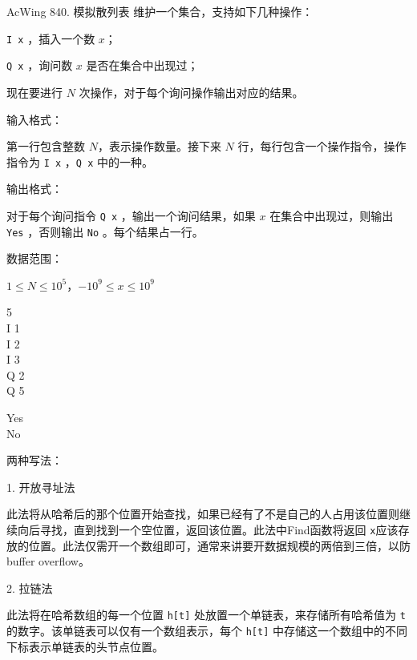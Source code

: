 \begin{titledbox}{AcWing 840. 模拟散列表}
维护一个集合，支持如下几种操作：

\lstinline{I x} ，插入一个数 $x$；

\lstinline{Q x} ，询问数 $x$ 是否在集合中出现过；

现在要进行 $N$ 次操作，对于每个询问操作输出对应的结果。

输入格式：

第一行包含整数 $N$，表示操作数量。接下来 $N$ 行，每行包含一个操作指令，操作指令为 \lstinline{I x} ，\lstinline{Q x}  中的一种。

输出格式：

对于每个询问指令 \lstinline{Q x} ，输出一个询问结果，如果 $x$ 在集合中出现过，则输出 \lstinline{Yes} ，否则输出 \lstinline{No} 。每个结果占一行。

数据范围：

$1 \le N \le 10^5$，$-10^9 \le x \le 10^9$

\begin{inputblock}
    5 \\
    I 1 \\
    I 2 \\
    I 3 \\
    Q 2 \\
    Q 5
\end{inputblock}
\begin{outputblock}
    Yes \\
    No
\end{outputblock}
\end{titledbox}

两种写法：

1. 开放寻址法

此法将从哈希后的那个位置开始查找，如果已经有了不是自己的人占用该位置则继续向后寻找，直到找到一个空位置，返回该位置。此法中Find函数将返回 \lstinline{x}应该存放的位置。此法仅需开一个数组即可，通常来讲要开数据规模的两倍到三倍，以防buffer overflow。

2. 拉链法

此法将在哈希数组的每一个位置 \lstinline{h[t]} 处放置一个单链表，来存储所有哈希值为 \lstinline{t} 的数字。该单链表可以仅有一个数组表示，每个 \lstinline{h[t]} 中存储这一个数组中的不同下标表示单链表的头节点位置。

\begin{mycpptwocol}[开放寻址法]
    
\end{mycpptwocol}

\begin{mycpptwocol}[拉链法]
    
\end{mycpptwocol}

